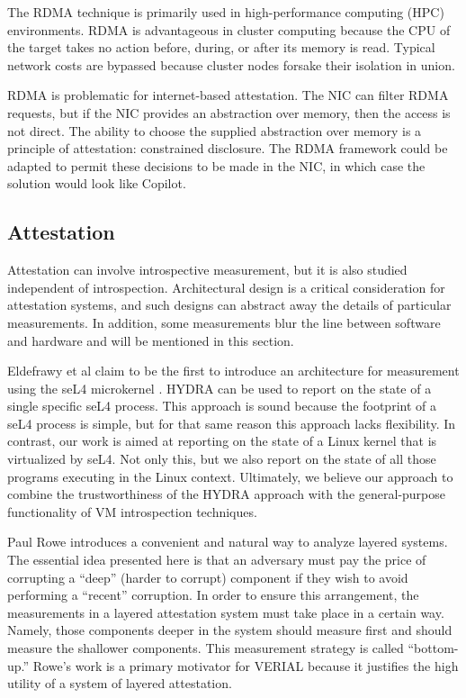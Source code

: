 \documentclass[a4paper,twoside]{article}
\begin{document}
The RDMA technique is primarily used in high-performance computing (HPC) environments. RDMA is advantageous in cluster computing because the CPU of the target takes no action before, during, or after its memory is read. Typical network costs are bypassed because cluster nodes forsake their isolation in union.

RDMA is problematic for internet-based attestation. The NIC can filter RDMA requests, but if the NIC provides an abstraction over memory, then the access is not direct. The ability to choose the supplied abstraction over memory is a principle of attestation: constrained disclosure. The RDMA framework could be adapted to permit these decisions to be made in the NIC, in which case the solution would look like Copilot.

\subsection{Attestation}

Attestation can involve introspective measurement, but it is also studied independent of introspection. Architectural design is a critical consideration for attestation systems, and such designs can abstract away the details of particular measurements. In addition, some measurements blur the line between software and hardware and will be mentioned in this section.

Eldefrawy et al claim to be the first to introduce an architecture for measurement using the seL4 microkernel \cite{HYDRA}. HYDRA can be used to report on the state of a single specific seL4 process. This approach is sound because the footprint of a seL4 process is simple, but for that same reason this approach lacks flexibility. In contrast, our work is aimed at reporting on the state of a Linux kernel that is virtualized by seL4. Not only this, but we also report on the state of all those programs executing in the Linux context. Ultimately, we believe our approach to combine the trustworthiness of the HYDRA approach with the general-purpose functionality of VM introspection techniques.

Paul Rowe introduces a convenient and natural way to analyze layered systems. \cite{Confining} The essential idea presented here is that an adversary must pay the price of corrupting a ``deep'' (harder to corrupt) component if they wish to avoid performing a ``recent'' corruption. In order to ensure this arrangement, the measurements in a layered attestation system must take place in a certain way. Namely, those components deeper in the system should measure first and should measure the shallower components. This measurement strategy is called ``bottom-up.'' Rowe's work is a primary motivator for VERIAL because it justifies the high utility of a system of layered attestation.
\end{document}
